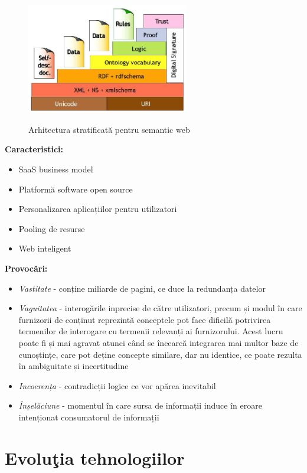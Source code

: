 \documentclass[12pt, a4paper]{report}
\begin{document}
\begin{figure}[htbp]
	\centering
	\includegraphics[width=0.63\textwidth]{layered_architecture.png} \label{fig:layered}
	\caption{Arhitectura stratificată pentru semantic web}
\end{figure}



\textbf{Caracteristici:}
\begin{itemize}
	\item SaaS business model
	\item Platformă software open source
	\item Personalizarea aplicațiilor pentru utilizatori
	\item Pooling de resurse
	\item Web inteligent
\end{itemize}


\textbf{Provocări:}
\begin{itemize}
	\item \emph{Vastitate} - conține miliarde de pagini, ce duce la redundanța datelor
	\item \emph{Vaguitatea} - interogările inprecise de către utilizatori, precum și modul în care furnizorii de conținut reprezintă conceptele pot face dificilă potrivirea termenilor de interogare cu termenii relevanți ai furnizorului. Acest lucru poate fi și mai agravat atunci când se încearcă integrarea mai multor baze de cunoștințe, care pot deține concepte similare, dar nu identice, ce poate rezulta în ambiguitate și incertitudine
	\item \emph{Incoerența} - contradicții logice ce vor apărea inevitabil
	\item \emph{Înșelăciune} - momentul în care sursa de informații induce în eroare intenționat consumatorul de informații
\end{itemize}

\section{Evolu\c tia tehnologiilor}
\end{document}
